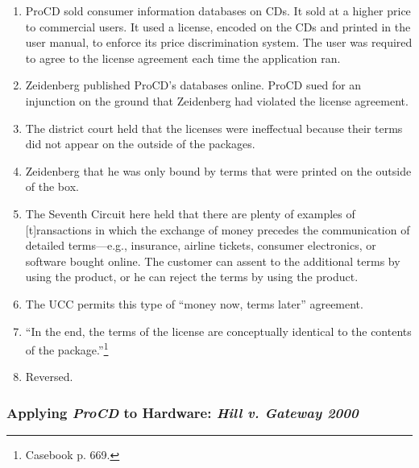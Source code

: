 \begin{enumerate}
    \item ProCD sold consumer information databases on CDs. It sold at a 
    higher price to commercial users. It used a license, encoded on the CDs 
    and printed in the user manual, to enforce its price discrimination 
    system. The user was required to agree to the license agreement each time 
    the application ran.
    \item Zeidenberg published ProCD's databases online. ProCD sued for an 
    injunction on the ground that Zeidenberg had violated the license 
    agreement.
    \item The district court held that the licenses were ineffectual because 
    their terms did not appear on the outside of the packages.
    \item Zeidenberg that he was only bound by terms that were printed on the 
    outside of the box.
    \item The Seventh Circuit here held that there are plenty of examples of 
    [t]ransactions in which the exchange of money precedes the communication 
    of detailed terms---e.g., insurance, airline tickets, consumer 
    electronics, or software bought online. The customer can assent to the 
    additional terms by using the product, or he can reject the terms by using 
    the product.
    \item The UCC permits this type of ``money now, terms later'' agreement.
    \item ``In the end, the terms of the license are conceptually identical to 
    the contents of the package.''\footnote{Casebook p. 669.}
    \item Reversed.
\end{enumerate}

\subsubsection{Applying \emph{ProCD} to Hardware: \emph{Hill v. Gateway 2000}}

